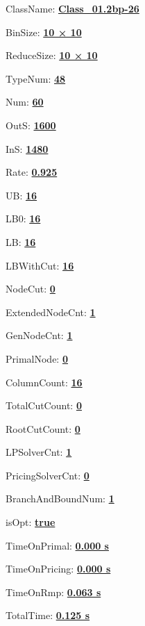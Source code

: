 \documentclass[11pt]{article}
\begin{document}
\pagestyle{empty}


ClassName: \underline{\textbf{Class_01.2bp-26}}
\par
BinSize: \underline{\textbf{10 × 10}}
\par
ReduceSize: \underline{\textbf{10 × 10}}
\par
TypeNum: \underline{\textbf{48}}
\par
Num: \underline{\textbf{60}}
\par
OutS: \underline{\textbf{1600}}
\par
InS: \underline{\textbf{1480}}
\par
Rate: \underline{\textbf{0.925}}
\par
UB: \underline{\textbf{16}}
\par
LB0: \underline{\textbf{16}}
\par
LB: \underline{\textbf{16}}
\par
LBWithCut: \underline{\textbf{16}}
\par
NodeCut: \underline{\textbf{0}}
\par
ExtendedNodeCnt: \underline{\textbf{1}}
\par
GenNodeCnt: \underline{\textbf{1}}
\par
PrimalNode: \underline{\textbf{0}}
\par
ColumnCount: \underline{\textbf{16}}
\par
TotalCutCount: \underline{\textbf{0}}
\par
RootCutCount: \underline{\textbf{0}}
\par
LPSolverCnt: \underline{\textbf{1}}
\par
PricingSolverCnt: \underline{\textbf{0}}
\par
BranchAndBoundNum: \underline{\textbf{1}}
\par
isOpt: \underline{\textbf{true}}
\par
TimeOnPrimal: \underline{\textbf{0.000 s}}
\par
TimeOnPricing: \underline{\textbf{0.000 s}}
\par
TimeOnRmp: \underline{\textbf{0.063 s}}
\par
TotalTime: \underline{\textbf{0.125 s}}
\par
\newpage


\end{document}
